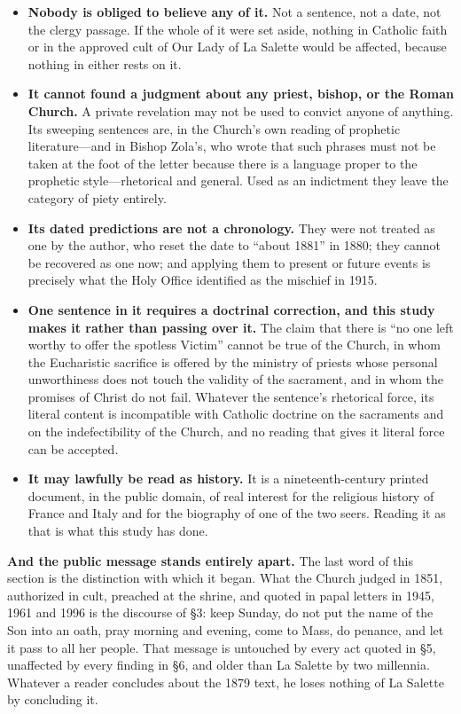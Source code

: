 \begin{itemize}[leftmargin=1.2em,itemsep=0.2em,topsep=0.25em]
\item \textbf{Nobody is obliged to believe any of it.} Not a
sentence, not a date, not the clergy passage. If the whole of it
were set aside, nothing in Catholic faith or in the approved cult of
Our Lady of La Salette would be affected, because nothing in either
rests on it.
\item \textbf{It cannot found a judgment about any priest, bishop,
or the Roman Church.} A private revelation may not be used to
convict anyone of anything. Its sweeping sentences are, in the
Church's own reading of prophetic literature---and in Bishop Zola's,
who wrote that such phrases must not be taken at the foot of the
letter because there is a language proper to the prophetic
style---rhetorical and general. Used as an indictment they leave the
category of piety entirely.
\item \textbf{Its dated predictions are not a chronology.} They were
not treated as one by the author, who reset the date to ``about
1881'' in 1880; they cannot be recovered as one now; and applying
them to present or future events is precisely what the Holy Office
identified as the mischief in 1915.
\item \textbf{One sentence in it requires a doctrinal
correction, and this study makes it rather than passing over it.}
The claim that there is ``no one left worthy to offer the spotless
Victim'' cannot be true of the Church, in whom the Eucharistic
sacrifice is offered by the ministry of priests whose personal
unworthiness does not touch the validity of the sacrament, and in
whom the promises of Christ do not fail. Whatever the sentence's
rhetorical force, its literal content is incompatible with Catholic
doctrine on the sacraments and on the indefectibility of the Church,
and no reading that gives it literal force can be accepted.
\item \textbf{It may lawfully be read as history.} It is a
nineteenth-century printed document, in the public domain, of real
interest for the religious history of France and Italy and for the
biography of one of the two seers. Reading it as that is what this
study has done.
\end{itemize}

\textbf{And the public message stands entirely apart.} The last word
of this section is the distinction with which it began. What the
Church judged in 1851, authorized in cult, preached at the shrine,
and quoted in papal letters in 1945, 1961 and 1996 is the discourse
of \S3: keep Sunday, do not put the name of the Son into an oath,
pray morning and evening, come to Mass, do penance, and let it pass
to all her people. That message is untouched by every act quoted in
\S5, unaffected by every finding in \S6, and older than La Salette
by two millennia. Whatever a reader concludes about the 1879 text,
he loses nothing of La Salette by concluding it.
